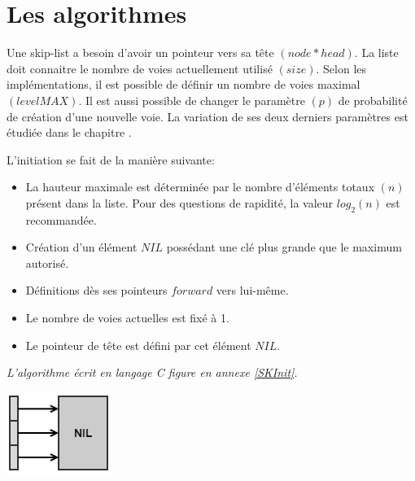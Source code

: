 \documentclass[hidelinks,a4paper, 12pt]{article}
\begin{document}
	\newpage
	\section{Les algorithmes}
	Une skip-list a besoin d'avoir un pointeur vers sa tête $(node* head)$. La liste doit connaitre le nombre de voies actuellement utilisé $(size)$. Selon les implémentations, il est possible de définir un nombre de voies maximal $(levelMAX)$. Il est aussi possible de changer le paramètre $(p)$ de probabilité de création d'une nouvelle voie. La variation de ses deux derniers paramètres est étudiée dans le chapitre .
	
	
	L'initiation se fait de la manière suivante:
	\begin{itemize}
		\item La hauteur maximale est déterminée par le nombre d'éléments totaux $(n)$ présent dans la liste. Pour des questions de rapidité, la valeur $log_2(n)$ est recommandée.
		\item Création d'un élément $NIL$ possédant une clé plus grande que le maximum autorisé.
		\item Définitions dès ses pointeurs $forward$ vers lui-même.
		\item Le nombre de voies actuelles est fixé à 1.
		\item Le pointeur de tête est défini par cet élément $NIL$.
	\end{itemize}
	\emph{L'algorithme écrit en langage C figure en annexe \ref{SKInit}.}
	
	\includegraphics{img/init}
	
\end{document}

